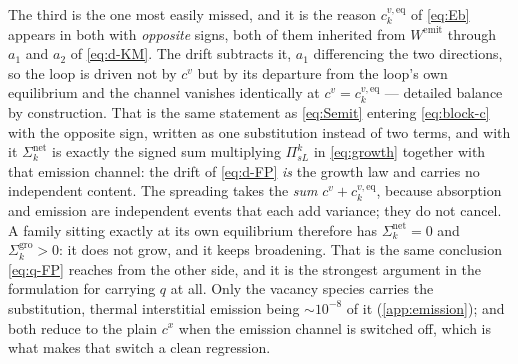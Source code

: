 The third is the one most easily missed, and it is the reason
$c^{v,\mathrm{eq}}_k$ of \cref{eq:Eb} appears in both with \emph{opposite}
signs, both of them inherited from $W^{\mathrm{emit}}$ through $a_1$ and $a_2$
of \cref{eq:d-KM}. The drift subtracts it, $a_1$ differencing the two
directions, so the loop is driven not by $c^{v}$ but by its departure from the
loop's own equilibrium and the channel vanishes identically at
$c^{v}=c^{v,\mathrm{eq}}_k$ --- detailed balance by construction. That is the
same statement as \cref{eq:Semit} entering \cref{eq:block-c} with the opposite
sign, written as one substitution instead of two terms, and with it
$\Sigma^{\mathrm{net}}_k$ is exactly the signed sum multiplying $\Pi^k_{sL}$ in
\cref{eq:growth} together with that emission channel: the drift of
\cref{eq:d-FP} \emph{is} the growth law and carries no independent content. The
spreading takes the \emph{sum} $c^{v}+c^{v,\mathrm{eq}}_k$, because absorption
and emission are independent events that each add variance; they do not cancel.
A family sitting exactly at its own equilibrium therefore has
$\Sigma^{\mathrm{net}}_k=0$ and $\Sigma^{\mathrm{gro}}_k>0$: it does not grow,
and it keeps broadening. That is the same conclusion \cref{eq:q-FP} reaches
from the other side, and it is the strongest argument in the formulation for
carrying $q$ at all. Only the vacancy species carries the substitution, thermal
interstitial emission being $\sim10^{-8}$ of it (\cref{app:emission}); and both
reduce to the plain $c^{x}$ when the emission channel is switched off, which is
what makes that switch a clean regression.

